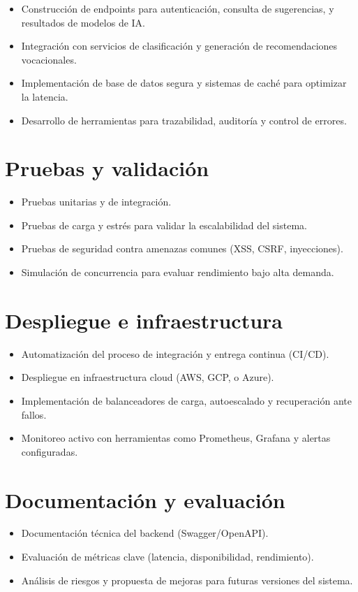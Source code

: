 \begin{itemize}
    \item Construcción de endpoints para autenticación, consulta de sugerencias, y resultados de modelos de IA.
    \item Integración con servicios de clasificación y generación de recomendaciones vocacionales.
    \item Implementación de base de datos segura y sistemas de caché para optimizar la latencia.
    \item Desarrollo de herramientas para trazabilidad, auditoría y control de errores.
\end{itemize}

\section{Pruebas y validación}

\begin{itemize}
    \item Pruebas unitarias y de integración.
    \item Pruebas de carga y estrés para validar la escalabilidad del sistema.
    \item Pruebas de seguridad contra amenazas comunes (XSS, CSRF, inyecciones).
    \item Simulación de concurrencia para evaluar rendimiento bajo alta demanda.
\end{itemize}

\section{Despliegue e infraestructura}

\begin{itemize}
    \item Automatización del proceso de integración y entrega continua (CI/CD).
    \item Despliegue en infraestructura cloud (AWS, GCP, o Azure).
    \item Implementación de balanceadores de carga, autoescalado y recuperación ante fallos.
    \item Monitoreo activo con herramientas como Prometheus, Grafana y alertas configuradas.
\end{itemize}

\section{Documentación y evaluación}

\begin{itemize}
    \item Documentación técnica del backend (Swagger/OpenAPI).
    \item Evaluación de métricas clave (latencia, disponibilidad, rendimiento).
    \item Análisis de riesgos y propuesta de mejoras para futuras versiones del sistema.
\end{itemize}
